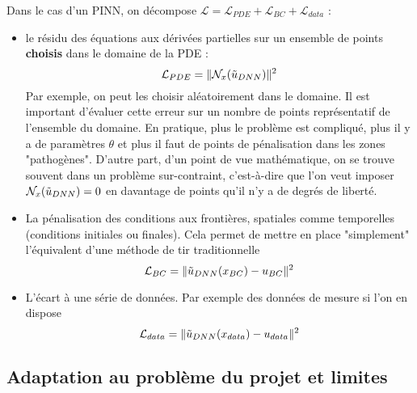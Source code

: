 Dans le cas d'un PINN, on décompose $\mathcal{L} = \mathcal{L}_{PDE} + \mathcal{L}_{BC} + \mathcal{L}_{data}$ :
\begin{itemize}
    \item le résidu des équations aux dérivées partielles sur un ensemble de points \textbf{choisis} dans le domaine de la PDE :
    \begin{equation}
        \mathcal{L}_{PDE} = \| \mathcal{N}_x(\Tilde{u}_{DNN})\|^2
    \end{equation}
    Par exemple, on peut les choisir aléatoirement dans le domaine. Il est important d'évaluer cette erreur sur un nombre de points représentatif de l'ensemble du domaine. En pratique, plus le problème est compliqué, plus il y a de paramètres $\theta$ et plus il faut de points de pénalisation dans les zones "pathogènes". D'autre part, d'un point de vue mathématique, on se trouve souvent dans un problème sur-contraint, c'est-à-dire que l'on veut imposer $\mathcal{N}_x(\Tilde{u}_{DNN})=0$ en davantage de points qu'il n'y a de degrés de liberté.
    \item La pénalisation des conditions aux frontières, spatiales comme temporelles (conditions initiales ou finales). Cela permet de mettre en place "simplement" l'équivalent d'une méthode de tir traditionnelle
        \begin{equation}
        \mathcal{L}_{BC} = \| \Tilde{u}_{DNN}(x_{BC}) - u_{BC}\|^2
    \end{equation}
    \item L'écart à une série de données. Par exemple des données de mesure si l'on en dispose 
        \begin{equation}
        \mathcal{L}_{data} = \| \Tilde{u}_{DNN}(x_{data}) - u_{data}\|^2
    \end{equation}
\end{itemize}



\subsection{Adaptation au problème du projet et limites}

